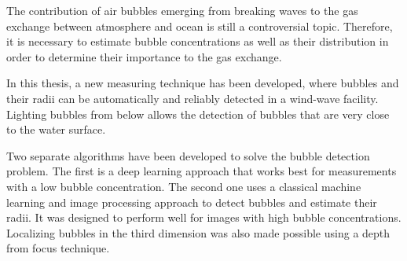 The contribution of air bubbles emerging from breaking waves to the gas exchange between atmosphere and ocean is still a controversial topic. Therefore, it is necessary to estimate bubble concentrations as well as their distribution in order to determine their importance to the gas exchange. 

In this thesis, a new measuring technique has been developed, where bubbles and their radii can be automatically and reliably detected in a wind-wave facility. 
Lighting bubbles from below allows the detection of bubbles that are very close to the water surface. 

Two separate algorithms have been developed to solve the bubble detection problem. The first is a deep learning approach that works best for measurements with a low bubble concentration. The second one uses a classical machine learning and image processing approach to detect bubbles and estimate their radii. It was designed to perform well for images with high bubble concentrations. Localizing bubbles in the third dimension was also made possible using a depth from focus technique. 